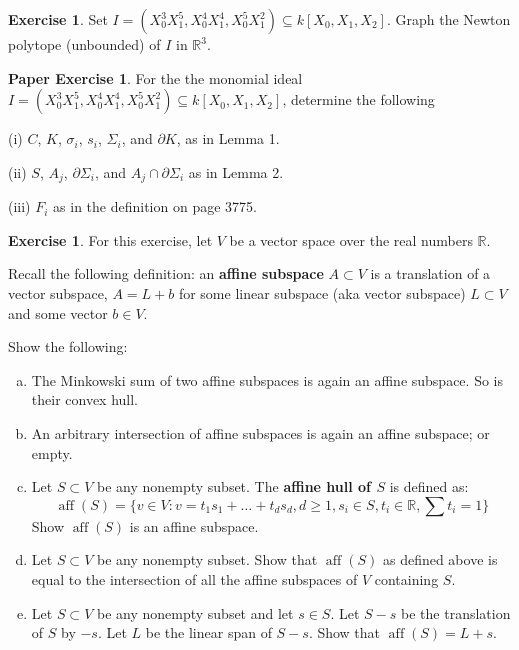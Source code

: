 \documentclass{amsart}
\theoremstyle{plain}
\theoremstyle{definition}
\newtheorem{exercise}[theorem]{Exercise}
\newtheorem{paperexercise}[theorem]{Paper Exercise}
\theoremstyle{definition}
\newcommand{\defining}[1]{\textbf{#1}}
\newcommand{\R}{\mathbb{R}}
\newcommand{\boundary}{\partial}
\DeclareMathOperator{\aff}{aff}
\begin{document}
\begin{exercise}  Set $I =   (X_0^3X_1^5, X_0^4X_1^4, X_0^5X_1^2) \subseteq k[X_0, X_1, X_2]$.
Graph the Newton polytope (unbounded) of $I$ in $\mathbb R^3$.  
\end{exercise}





\begin{paperexercise}  For the the monomial ideal $I = (X_0^3X_1^5, X_0^4X_1^4, X_0^5X_1^2) \subseteq k[X_0, X_1, X_2]$, determine the following

(i) $C$, $K$, $\sigma_i$, $s_i$, $\Sigma_i$, and $\boundary K$, as in Lemma 1.

(ii) $S$, $A_j$, $\boundary \Sigma_i$, and $A_j \cap \boundary \Sigma_i$ as in Lemma 2.

(iii) $F_i$ as in the definition on page 3775.
\end{paperexercise}






\begin{exercise}
For this exercise, let $V$ be a vector space over the real numbers $\R$.

Recall the following definition: an \defining{affine subspace} $A \subset V$ is a translation of a vector
subspace, $A = L + b$ for some linear subspace (aka vector subspace) $L\subset V$ and some vector $b \in V$.

Show the following:
\begin{enumerate}[a.]
\item The Minkowski sum of two affine subspaces is again an affine subspace.
So is their convex hull.
\item An arbitrary intersection of affine subspaces is again an affine subspace; or empty.
\item Let $S \subset V$ be any nonempty subset. The \defining{affine hull of $S$} is defined as:
\[ \aff(S) = \{ v \in V : v = t_1 s_1 + \dots + t_d s_d, d \geq 1, s_i \in S, t_i \in \R, \sum t_i = 1 \} \]
Show $\aff(S)$ is an affine subspace.
\item Let $S \subset V$ be any nonempty subset. Show that $\aff(S)$ as defined above
is equal to the intersection of all the affine subspaces of $V$ containing $S$.
\item Let $S \subset V$ be any nonempty subset and let $s \in S$.
Let $S - s$ be the translation of $S$ by $-s$. Let $L$ be the linear span of $S-s$.
Show that $\aff(S) = L+s$.
\end{enumerate}
\end{exercise}
\end{document}
